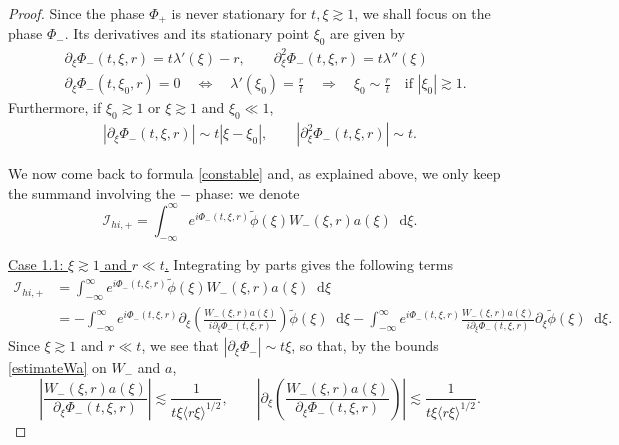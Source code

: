 \documentclass[11 pt]{amsart}
\theoremstyle{definition}
\theoremstyle{remark}
\numberwithin{equation}{section}
\newcommand{\dd}{\mathop{}\!\mathrm{d}}
\begin{document}
\begin{proof}
Since the phase $\Phi_+$ is never stationary for $t,\xi \gtrsim 1$, we shall focus on the phase $\Phi_-$. Its derivatives and its stationary point $\xi_0$ are given by
\begin{align*}
& \partial_\xi \Phi_-(t,\xi,r) = t \lambda'(\xi) - r, \qquad \partial_\xi^2 \Phi_-(t,\xi,r) = t \lambda''(\xi) \\
& \partial_\xi \Phi_-(t,\xi_0,r) = 0  \quad \Longleftrightarrow \quad \lambda'(\xi_0) = \frac rt \quad \Longrightarrow \quad \xi_0 \sim \frac rt \quad \mbox{if $|\xi_0| \gtrsim 1$}.
\end{align*}
Furthermore, if $\xi_0 \gtrsim 1$ or $\xi \gtrsim 1$ and $\xi_0 \ll 1$,
\begin{equation}
\label{boundphi}
\begin{split}
| \partial_\xi \Phi_-(t,\xi,r) | \sim t |\xi-\xi_0|, \qquad  |\partial_\xi^2 \Phi_-(t,\xi,r) | \sim t .
\end{split}
\end{equation}

We now come back to formula \eqref{constable} and, as explained above, we only keep the summand involving the $-$ phase: we denote
$$
\mathcal{I}_{hi,+} =  \int_{-\infty}^\infty e^{i \Phi_{-}(t,\xi,r)}   \widetilde{\phi} (\xi) W_{-}(\xi,r) a(\xi) \dd \xi.
$$

\medskip

\noindent \underline{Case 1.1: $\xi \gtrsim 1$ and $r \ll t$.} Integrating by parts gives the following terms
\begin{align*}
\mathcal{I}_{hi,+} & = \int_{-\infty}^\infty e^{i \Phi_{-}(t,\xi,r)}   \widetilde{\phi} (\xi) W_{-}(\xi,r) a(\xi) \dd \xi \\
&  = - \int_{-\infty}^\infty e^{i \Phi_{-}(t,\xi,r)} \partial_\xi \left( \frac{W_{-}(\xi,r) a(\xi) }{i \partial_\xi \Phi_-(t,\xi,r)} \right) \widetilde{\phi} (\xi) \dd \xi
- \int_{-\infty}^\infty e^{i \Phi_{-}(t,\xi,r)} \frac{W_{-}(\xi,r) a(\xi) }{i \partial_\xi \Phi_-(t,\xi,r)}  \partial_\xi   \widetilde{\phi} (\xi) \dd \xi.
\end{align*}
Since $\xi \gtrsim 1$ and $r \ll t$, we see that $|\partial_\xi \Phi_- |\sim t \xi$, so that, by the bounds \eqref{estimateWa} on $W_-$ and $a$,
$$
\left| \frac{W_{-}(\xi,r) a(\xi) }{\partial_\xi \Phi_{-}(t,\xi,r)} \right| \lesssim \frac{1}{ t\xi \langle r \xi \rangle^{1/2}}, \qquad \left| \partial_\xi \left( \frac{W_{-}(\xi,r) a(\xi) }{\partial_\xi \Phi_{-}(t,\xi,r)} \right) \right| \lesssim \frac{1}{ t  \xi \langle r \xi\rangle^{1/2}}.
$$


\end{proof}
\end{document}
